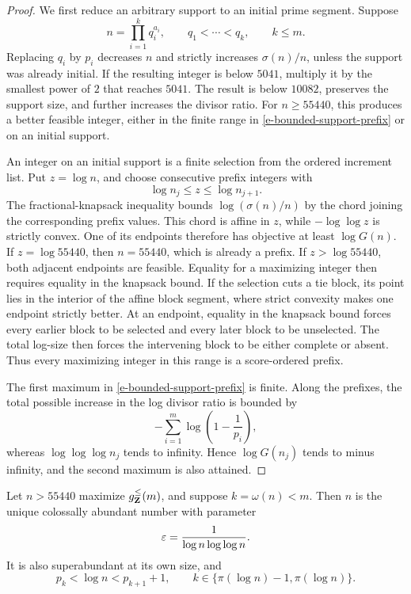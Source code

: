 \begin{proof}
We first reduce an arbitrary support to an initial prime segment. Suppose
\[
    n=\prod_{i=1}^{k}q_i^{a_i},
    \qquad
    q_1<\cdots<q_k,
    \qquad
    k\leq m.
\]
Replacing \(q_i\) by \(p_i\) decreases \(n\) and strictly increases
\(\sigma(n)/n\), unless the support was already initial. If the resulting
integer is below \(5041\), multiply it by the smallest power of \(2\)
that reaches \(5041\). The result is below \(10082\), preserves the
support size, and further increases the divisor ratio. For
\(n\geq55440\), this produces a better feasible integer, either in the
finite range in \eqref{e-bounded-support-prefix} or on an initial
support.

An integer on an initial support is a finite selection from the ordered
increment list. Put \(z=\log n\), and choose consecutive prefix integers
with
\[
    \log n_j\leq z\leq\log n_{j+1}.
\]
The fractional-knapsack inequality bounds
\(\log(\sigma(n)/n)\) by the chord joining the corresponding prefix
values. This chord is affine in \(z\), while \(-\log\log z\) is strictly
convex. One of its endpoints therefore has objective at least
\(\log G(n)\). If \(z=\log55440\), then \(n=55440\), which is already a
prefix. If \(z>\log55440\), both adjacent endpoints are feasible. Equality
for a maximizing integer then requires equality in the knapsack bound. If
the selection cuts a tie block, its point lies in the interior of the
affine block segment, where strict convexity makes one endpoint strictly
better.
At an endpoint, equality in the knapsack bound forces every earlier block
to be selected and every later block to be unselected. The total log-size
then forces the intervening block to be either complete or absent. Thus
every maximizing integer in this range is a score-ordered prefix.

The first maximum in \eqref{e-bounded-support-prefix} is finite. Along
the prefixes, the total possible increase in the log divisor ratio is
bounded by
\[
    -\sum_{i=1}^{m}\log\left(1-\frac1{p_i}\right),
\]
whereas \(\log\log\log n_j\) tends to infinity. Hence
\(\log G(n_j)\) tends to minus infinity, and the second maximum is also
attained.
\end{proof}

\begin{corollary}
\label{cor-bounded-support-ca}
Let \(n>55440\) maximize \(g_{\mathbf{Z}}^{\leq}(m)\), and suppose
\(k=\omega(n)<m\). Then \(n\) is the unique colossally abundant number
with parameter
\[
    \varepsilon=\frac1{\log n\log\log n}.
\]
It is also superabundant at its own size, and
\[
    p_k<\log n<p_{k+1}+1,
    \qquad
    k\in\{\pi(\log n)-1,\pi(\log n)\}.
\]
\end{corollary}

